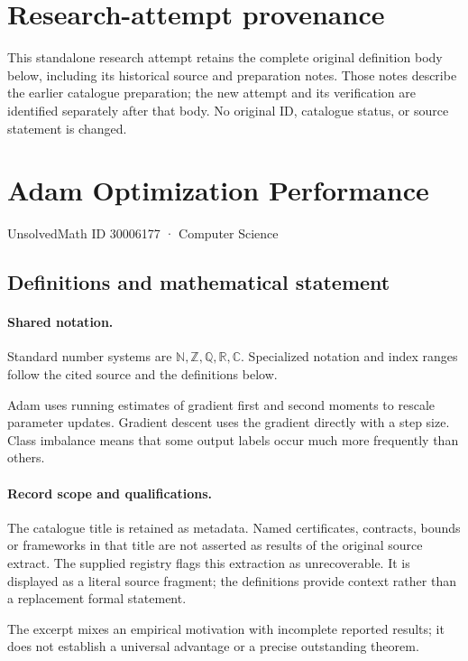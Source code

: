 \documentclass[11pt]{article}
\begin{document}
\section*{Research-attempt provenance}
This standalone research attempt retains the complete original definition body below,
including its historical source and preparation notes. Those notes describe the
earlier catalogue preparation; the new attempt and its verification are identified
separately after that body. No original ID, catalogue status, or source statement is changed.

\section{Adam Optimization Performance}\label{30006177}
{\small UnsolvedMath ID 30006177 · Computer Science}
\subsection{Definitions and mathematical statement}

\paragraph{Shared notation.}Standard number systems are $\mathbb N,\mathbb Z,\mathbb Q,\mathbb R,\mathbb C$. Specialized notation and index ranges follow the cited source and the definitions below.


Adam uses running estimates of gradient first and second moments to rescale parameter updates. Gradient descent uses the gradient directly with a step size. Class imbalance means that some output labels occur much more frequently than others.
\paragraph{Record scope and qualifications.}
The catalogue title is retained as metadata. Named certificates, contracts, bounds or frameworks in that title are not asserted as results of the original source extract.
The supplied registry flags this extraction as unrecoverable. It is displayed as a literal source fragment; the definitions provide context rather than a replacement formal statement.

The excerpt mixes an empirical motivation with incomplete reported results; it does not establish a universal advantage or a precise outstanding theorem.
\end{document}
